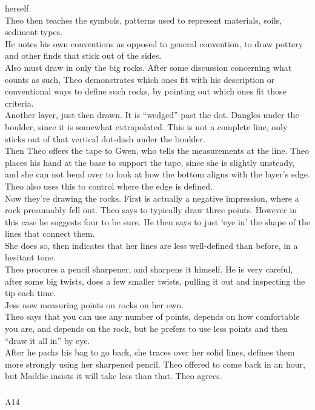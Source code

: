 \documentclass[
]{article}
\makeatletter
\let\oldsubparagraph\subparagraph
\renewcommand{\subparagraph}{
    \@ifstar
      \xxxSubParagraphStar
      \xxxSubParagraphNoStar
  }
\newcommand{\xxxSubParagraphStar}[1]{\oldsubparagraph*{#1}\mbox{}}
\newcommand{\xxxSubParagraphNoStar}[1]{\oldsubparagraph{#1}\mbox{}}
\makeatother
\begin{document}
herself.\\
Theo then teaches the symbols, patterns used to represent materials,
soils, sediment types.\\
He notes his own conventions as opposed to general convention, to draw
pottery and other finds that stick out of the sides.\\
Also must draw in only the big rocks. After some discussion concerning
what counts as such, Theo demonstrates which ones fit with his
description or conventional ways to define such rocks, by pointing out
which ones fit those criteria.\\
Another layer, just then drawn. It is ``wedged'' past the dot. Dangles
under the boulder, since it is somewhat extrapolated. This is not a
complete line, only sticks out of that vertical dot-dash under the
boulder.\\
Then Theo offers the tape to Gwen, who tells the measurements at the
line. Theo places his hand at the base to support the tape, since she is
slightly unsteady, and she can not bend over to look at how the bottom
aligns with the layer's edge. Theo also uses this to control where the
edge is defined.\\
Now they're drawing the rocks. First is actually a negative impression,
where a rock presumably fell out. Theo says to typically draw three
points. However in this case he suggests four to be sure. He then says
to just `eye in' the shape of the lines that connect them.\\
She does so, then indicates that her lines are less well-defined than
before, in a hesitant tone.\\
Theo procures a pencil sharpener, and sharpens it himself. He is very
careful, after some big twists, does a few smaller twists, pulling it
out and inspecting the tip each time.\\
Jess now measuring points on rocks on her own.\\
Theo says that you can use any number of points, depends on how
comfortable you are, and depends on the rock, but he prefers to use less
points and then ``draw it all in'' by eye.\\
After he packs his bag to go back, she traces over her solid lines,
defines them more strongly using her sharpened pencil. Theo offered to
come back in an hour, but Maddie insists it will take less than that.
Theo agrees.

\subparagraph{A14}\label{sec-A14}
\end{document}
